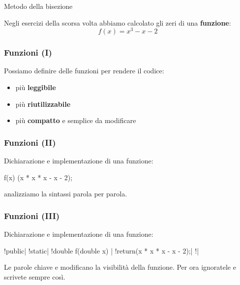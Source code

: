 
\begin{frame}{Metodo della bisezione}

  Negli esercizi della scorsa volta abbiamo calcolato gli zeri di una \textbf{funzione}:
  \begin{equation}
    f(x) = x^3 - x - 2
  \end{equation}

\end{frame}


\begin{frame}[fragile]\frametitle{Funzioni (I)}

  Possiamo definire delle funzioni per rendere il codice:
  \begin{itemize}
    \item più \textbf{leggibile}
    \item più \textbf{riutilizzabile}
    \item più \textbf{compatto} e semplice da modificare
  \end{itemize}
\end{frame}

\begin{frame}[fragile]\frametitle{Funzioni (II)}

  Dichiarazione e implementazione di una funzione:

  \begin{JavaCodePlain}[commandchars=\\!|]
  \Jpublic \Jstatic \Jdouble f(\Jdouble x) {
      \Jreturn(x * x * x - x - 2);
  }
  \end{JavaCodePlain}     
  analizziamo la sintassi parola per parola.

\end{frame}

\begin{frame}[fragile]\frametitle{Funzioni (III)}

  Dichiarazione e implementazione di una funzione:
  
  \begin{JavaCodePlain}[commandchars=\\!|]
  \Red!public| \Red!static| \Grey!double f(double x) {|
      \Grey!return(x * x * x - x - 2);|
  \Grey!}|
  \end{JavaCodePlain}
  
  Le parole chiave  e  modificano la
  visibilità della funzione. Per ora ignoratele e scrivete
  sempre così.

\end{frame}



